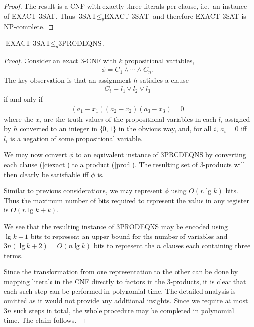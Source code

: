 \documentclass{article}
\begin{document}
\begin{claim*}[a]
\begin{proof}
		The result is a CNF with exactly three literals per clause, i.e.\ an instance of EXACT-3SAT.\@
		Thus $\text{3SAT}\leq_p\text{EXACT-3SAT}$ and therefore EXACT-3SAT is NP-complete.
	\end{proof}
\end{claim*}

\begin{claim*}[b]
	$\text{EXACT-3SAT}\leq_p\text{3PRODEQNS}$.
	\begin{proof}
		Consider an exact 3-CNF with $k$ propositional variables,
		\begin{align*}
			\phi = C_1 \wedge \cdots \wedge C_n.
		\end{align*}
		The key observation is that an assignment $h$ satisfies a clause
		\begin{align}
			\label{ciexact}
			C_i = l_1 \vee l_2 \vee l_3
		\end{align}
		if and only if
		\begin{align}
			\label{prod}
			(a_1-x_1)(a_2-x_2)(a_3-x_3) = 0
		\end{align}
		where the $x_i$ are the truth values of the propositional variables in each $l_i$ assigned
		by $h$ converted to an integer in $\{0,1\}$ in the obvious way, and, for all $i$, $a_i=0$
		iff $l_i$ is a negation of some propositional variable.

		We may now convert $\phi$ to an equivalent instance of 3PRODEQNS by converting each clause
		(\ref{ciexact}) to a product (\ref{prod}). The resulting set of 3-products will then clearly
		be satisfiable iff $\phi$ is.

		Similar to previous considerations, we may represent $\phi$ using $O(n\lg k)$ bits.
		Thus the maximum number of bits required to represent the value in any register is $O(n\lg k + k)$.

		We see that the resulting instance of 3PRODEQNS may be encoded using $\lg k+1$ bits to represent
		an upper bound for the number of variables and $3n(\lg k + 2)=O(n\lg k)$ bits to represent the $n$
		clauses each containing three terms.

		Since the transformation from one representation to the other can be done by mapping literals in the CNF
		directly to factors in the 3-products, it is clear that each such step can be performed in polynomial time.
		The detailed analysis is omitted as it would not provide any additional insights.
		Since we require at most $3n$ such steps in total, the whole procedure may be completed
		in polynomial time. The claim follows.
	\end{proof}
\end{claim*}
\end{document}
